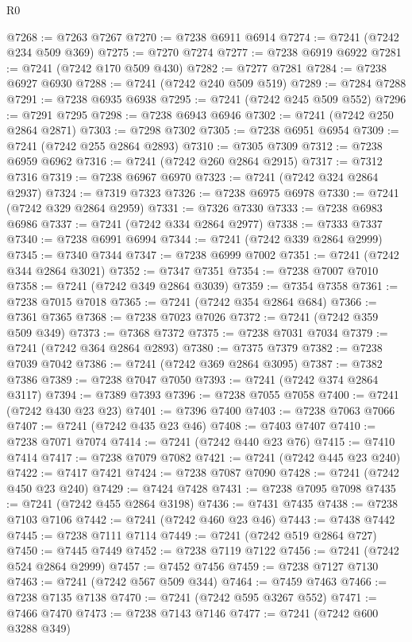 \begin{lexlean}{R0}
\begin{coremodule}
@7268 := @7263 @7267
@7270 := @7238 @6911 @6914
@7274 := @7241 (@7242 @234 @509 @369)
@7275 := @7270 @7274
@7277 := @7238 @6919 @6922
@7281 := @7241 (@7242 @170 @509 @430)
@7282 := @7277 @7281
@7284 := @7238 @6927 @6930
@7288 := @7241 (@7242 @240 @509 @519)
@7289 := @7284 @7288
@7291 := @7238 @6935 @6938
@7295 := @7241 (@7242 @245 @509 @552)
@7296 := @7291 @7295
@7298 := @7238 @6943 @6946
@7302 := @7241 (@7242 @250 @2864 @2871)
@7303 := @7298 @7302
@7305 := @7238 @6951 @6954
@7309 := @7241 (@7242 @255 @2864 @2893)
@7310 := @7305 @7309
@7312 := @7238 @6959 @6962
@7316 := @7241 (@7242 @260 @2864 @2915)
@7317 := @7312 @7316
@7319 := @7238 @6967 @6970
@7323 := @7241 (@7242 @324 @2864 @2937)
@7324 := @7319 @7323
@7326 := @7238 @6975 @6978
@7330 := @7241 (@7242 @329 @2864 @2959)
@7331 := @7326 @7330
@7333 := @7238 @6983 @6986
@7337 := @7241 (@7242 @334 @2864 @2977)
@7338 := @7333 @7337
@7340 := @7238 @6991 @6994
@7344 := @7241 (@7242 @339 @2864 @2999)
@7345 := @7340 @7344
@7347 := @7238 @6999 @7002
@7351 := @7241 (@7242 @344 @2864 @3021)
@7352 := @7347 @7351
@7354 := @7238 @7007 @7010
@7358 := @7241 (@7242 @349 @2864 @3039)
@7359 := @7354 @7358
@7361 := @7238 @7015 @7018
@7365 := @7241 (@7242 @354 @2864 @684)
@7366 := @7361 @7365
@7368 := @7238 @7023 @7026
@7372 := @7241 (@7242 @359 @509 @349)
@7373 := @7368 @7372
@7375 := @7238 @7031 @7034
@7379 := @7241 (@7242 @364 @2864 @2893)
@7380 := @7375 @7379
@7382 := @7238 @7039 @7042
@7386 := @7241 (@7242 @369 @2864 @3095)
@7387 := @7382 @7386
@7389 := @7238 @7047 @7050
@7393 := @7241 (@7242 @374 @2864 @3117)
@7394 := @7389 @7393
@7396 := @7238 @7055 @7058
@7400 := @7241 (@7242 @430 @23 @23)
@7401 := @7396 @7400
@7403 := @7238 @7063 @7066
@7407 := @7241 (@7242 @435 @23 @46)
@7408 := @7403 @7407
@7410 := @7238 @7071 @7074
@7414 := @7241 (@7242 @440 @23 @76)
@7415 := @7410 @7414
@7417 := @7238 @7079 @7082
@7421 := @7241 (@7242 @445 @23 @240)
@7422 := @7417 @7421
@7424 := @7238 @7087 @7090
@7428 := @7241 (@7242 @450 @23 @240)
@7429 := @7424 @7428
@7431 := @7238 @7095 @7098
@7435 := @7241 (@7242 @455 @2864 @3198)
@7436 := @7431 @7435
@7438 := @7238 @7103 @7106
@7442 := @7241 (@7242 @460 @23 @46)
@7443 := @7438 @7442
@7445 := @7238 @7111 @7114
@7449 := @7241 (@7242 @519 @2864 @727)
@7450 := @7445 @7449
@7452 := @7238 @7119 @7122
@7456 := @7241 (@7242 @524 @2864 @2999)
@7457 := @7452 @7456
@7459 := @7238 @7127 @7130
@7463 := @7241 (@7242 @567 @509 @344)
@7464 := @7459 @7463
@7466 := @7238 @7135 @7138
@7470 := @7241 (@7242 @595 @3267 @552)
@7471 := @7466 @7470
@7473 := @7238 @7143 @7146
@7477 := @7241 (@7242 @600 @3288 @349)

\end{coremodule}
\end{lexlean}

